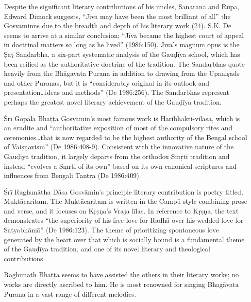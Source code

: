 Despite the significant literary contributions of his uncles, Sanātana and Rūpa, Edward Dimock suggests, “Jīva may have been the most brilliant of all” the Gosvāminns due to the breadth and depth of his literary work (24). S.K. De seems to arrive at a similar conclusion: “Jīva became the highest court of appeal in doctrinal matters so long as he lived” (1986:150). Jīva’s magnum opus is the Ṣaṭ Sandarbha, a six-part systematic analysis of the Gauḍīya school, which has been reified as the authoritative doctrine of the tradition. The Sandarbhas quote heavily from the Bhāgavata Purana in addition to drawing from the Upaniṣads and other Puranas, but it is “considerably original in its outlook and presentation…ideas and methods” (De 1986:256). The Sandarbhas represent perhaps the greatest novel literary achievement of the Gauḍīya tradition.  

Śrī Gopāla Bhaṭṭa Gosvāmin’s most famous work is Haribhakti-vilāsa, which is an erudite and “authoritative exposition of most of the compulsory rites and ceremonies…that is now regarded to be the highest authority of the Bengal school of Vaiṣṇavism” (De 1986:408-9). Consistent with the innovative nature of the Gauḍīya tradition, it largely departs from the orthodox Smṛti tradition and instead “evolves a Sṃrti of its own” based on its own canonical scriptures and influences from Bengali Tantra (De 1986:409). 

Śrī Raghunātha Dāsa Gosvāmin’s principle literary contribution is poetry titled, Muktācaritam. The Muktācaritam is written in the Campū style combining prose and verse, and it focuses on Kṛṣṇa’s Vraja līlas. In reference to Kṛṣṇa, the text demonstrates “the superiority of his free love for Radhā over his wedded love for Satyabhāmā” (De 1986:123). The theme of prioritizing spontaneous love generated by the heart over that which is socially bound is a fundamental theme of the Gauḍīya tradition, and one of its novel literary and theological contributions. 

Raghunāth Bhaṭṭa seems to have assisted the others in their literary works; no works are directly ascribed to him. He is most renowned for singing Bhagāvata Purana in a vast range of different melodies. 

